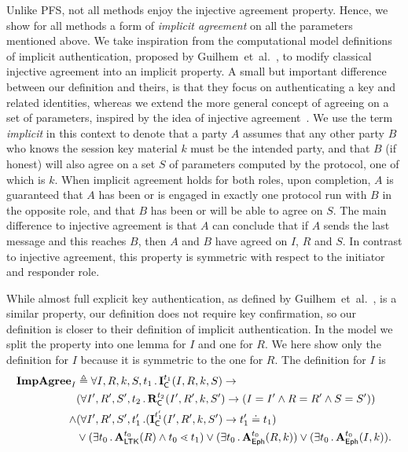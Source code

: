 Unlike PFS, not all \mEdhoc{} methods enjoy the injective agreement property.
%
Hence, we show for all methods a form of \emph{implicit agreement} on all the
parameters mentioned above.
%
We take inspiration from the computational model definitions of implicit
authentication, proposed by Guilhem~et~al.~\cite{DBLP:conf/csfw/GuilhemFW20}, to
modify classical injective agreement into an implicit property.
%
A small but important difference between our definition and theirs, is that
they focus on
authenticating a key and related identities, whereas we extend the more general
concept of agreeing on a set of parameters, inspired by the idea of injective
agreement~\cite{DBLP:conf/csfw/Lowe97a}.
%
We use the term \emph{implicit} in this context to denote that a party $A$
assumes that any other party $B$ who knows the session key material $k$ must
be the intended party, and that $B$ (if honest) will also agree on a set
$S$ of parameters computed by the protocol, one of which is $k$.
%
When implicit agreement holds for both roles, upon completion, $A$ is guaranteed
that $A$ has been or is engaged in exactly one protocol run with $B$ in the
opposite role, and that $B$ has been or will be able to agree on $S$.
%
The main difference to injective agreement is that $A$ can conclude that if
$A$ sends the last message and this reaches $B$, then $A$ and $B$ have agreed
on $I$, $R$ and $S$.
%
In contrast to injective agreement, this property is symmetric with respect to
the initiator and responder role.
%

%
While almost full explicit key authentication, as defined by
Guilhem~et~al.~\cite{DBLP:conf/csfw/GuilhemFW20}, is a similar property, our
definition does not require key confirmation, so our definition is closer to
their definition of implicit authentication.
%
In the \mTamarin{} model we split the property into one lemma for
$I$ and one for $R$.
%
We here show only the definition for $I$ because it is symmetric to the one
for $R$.
%
The definition for $I$ is
\begin{align*}
    \mathbf{ImpAgree}_I& \triangleq
    \forall I, R, k, S, t_1\operatorname{.} \mathbf{I}_{\textsf{C}}^{t_1}(I, R, k, S)
    \rightarrow\\
      &(\forall I', R', S', t_2\operatorname{.} \mathbf{R}_{\textsf{C}}^{t_2}(I', R', k, S') \rightarrow
             (I=I' \land R=R' \land S=S'))\\
      \land &(\forall I', R', S', t_1'\operatorname{.}
        (\mathbf{I}_{\textsf{C}}^{t_1'}(I', R', k, S') \rightarrow t_1' \doteq t_1
        )\\
    &\lor(\exists t_0\operatorname{.} \mathbf{A}_{\textsf{LTK}}^{t_0}(R) \land t_0 \lessdot t_1)
    \lor(\exists t_0\operatorname{.} \mathbf{A}_{\textsf{Eph}}^{t_0}(R, k))
    \lor(\exists t_0\operatorname{.} \mathbf{A}_{\textsf{Eph}}^{t_0}(I, k)).
\end{align*}
%

